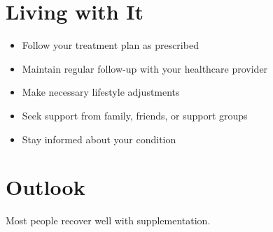\section{Living with It}
\begin{itemize}[noitemsep]
  \item Follow your treatment plan as prescribed
  \item Maintain regular follow-up with your healthcare provider
  \item Make necessary lifestyle adjustments
  \item Seek support from family, friends, or support groups
  \item Stay informed about your condition
\end{itemize}
\section{Outlook}
Most people recover well with supplementation.
